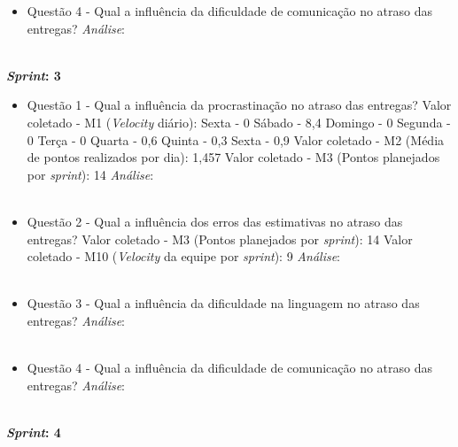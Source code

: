 \begin{apendicesenv}
\begin{itemize}
	  \item Questão 4 - Qual a influência da dificuldade de comunicação no atraso das entregas?
	    \subitem \textit{Análise}:
	  \\
	  \\
	  
	\end{itemize}
	    \vfill
	    \pagebreak
	\textbf{\textit{Sprint}: 3}
	
	\begin{itemize}
	  
	  \item Questão 1 - Qual a influência da procrastinação no atraso das entregas?
	    \subitem Valor coletado - M1 (\textit{Velocity} diário):
	      \subsubitem Sexta - 0
	      \subsubitem Sábado - 8,4
	      \subsubitem Domingo - 0
	      \subsubitem Segunda - 0
	      \subsubitem Terça - 0
	      \subsubitem Quarta - 0,6
	      \subsubitem Quinta - 0,3
	      \subsubitem Sexta - 0,9
	    \subitem Valor coletado - M2 (Média de pontos realizados por dia): 1,457
	    \subitem Valor coletado - M3 (Pontos planejados por \textit{sprint}): 14
	    \subitem \textit{Análise}: 
	    \\
	    \\

	  \item Questão 2 - Qual a influência dos erros das estimativas no atraso das entregas? 
	    \subitem Valor coletado - M3 (Pontos planejados por \textit{sprint}): 14
	    \subitem Valor coletado - M10 (\textit{Velocity} da equipe por \textit{sprint}): 9
	    \subitem \textit{Análise}:
	    \\
	    \\
	    
	  \item Questão 3 - Qual a influência da dificuldade na linguagem no atraso das entregas?
	    \subitem \textit{Análise}:
	  \\
	  \\
	  
	  \item Questão 4 - Qual a influência da dificuldade de comunicação no atraso das entregas?
	    \subitem \textit{Análise}:
	  \\
	  \\
	  
	\end{itemize}
	    \vfill
	    \pagebreak
	\textbf{\textit{Sprint}: 4}
	
	\begin{itemize}
	  

\end{itemize}
\end{apendicesenv}
